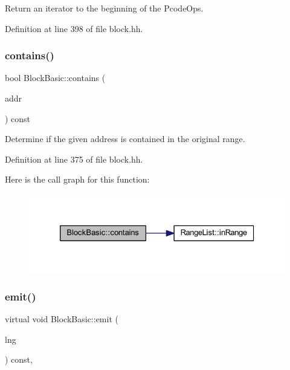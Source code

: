 Return an iterator to the beginning of the Pcode\+Ops. 



Definition at line 398 of file block.\+hh.

\mbox{\label{class_block_basic_a68b76d2c45556951a5d975e5d3a235df}} 
\subsubsection{\texorpdfstring{contains()}{contains()}}
{\footnotesize\ttfamily bool Block\+Basic\+::contains (\begin{DoxyParamCaption}\item[{const \mbox{\hyperlink{class_address}{Address}} \&}]{addr }\end{DoxyParamCaption}) const\hspace{0.3cm}{\ttfamily [inline]}}



Determine if the given address is contained in the original range. 



Definition at line 375 of file block.\+hh.

Here is the call graph for this function\+:
\nopagebreak
\begin{figure}[H]
\begin{center}
\leavevmode
\includegraphics[width=326pt]{class_block_basic_a68b76d2c45556951a5d975e5d3a235df_cgraph}
\end{center}
\end{figure}
\mbox{\label{class_block_basic_a0b163426cb08cdecdcdd7305ecc6381e}} 
\subsubsection{\texorpdfstring{emit()}{emit()}}
{\footnotesize\ttfamily virtual void Block\+Basic\+::emit (\begin{DoxyParamCaption}\item[{\mbox{\hyperlink{class_print_language}{Print\+Language}} $\ast$}]{lng }\end{DoxyParamCaption}) const\hspace{0.3cm}{\ttfamily [inline]}, {\ttfamily [virtual]}}



